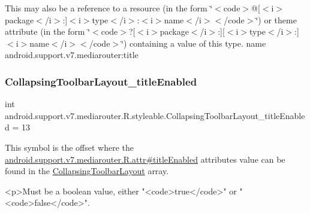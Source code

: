 This may also be a reference to a resource (in the form \char`\"{}$<$code$>$@\mbox{[}$<$i$>$package$<$/i$>$\+:\mbox{]}$<$i$>$type$<$/i$>$\+:$<$i$>$name$<$/i$>$$<$/code$>$\char`\"{}) or theme attribute (in the form \char`\"{}$<$code$>$?\mbox{[}$<$i$>$package$<$/i$>$\+:\mbox{]}\mbox{[}$<$i$>$type$<$/i$>$\+:\mbox{]}$<$i$>$name$<$/i$>$$<$/code$>$\char`\"{}) containing a value of this type.  name android.\+support.\+v7.\+mediarouter\+:title \mbox{\label{classandroid_1_1support_1_1v7_1_1mediarouter_1_1R_1_1styleable_afd96eea83afe0af62d5c951105c47546}} 
\subsubsection{\texorpdfstring{Collapsing\+Toolbar\+Layout\+\_\+title\+Enabled}{CollapsingToolbarLayout\_titleEnabled}}
{\footnotesize\ttfamily int android.\+support.\+v7.\+mediarouter.\+R.\+styleable.\+Collapsing\+Toolbar\+Layout\+\_\+title\+Enabled = 13\hspace{0.3cm}{\ttfamily [static]}}

This symbol is the offset where the \hyperlink{classandroid_1_1support_1_1v7_1_1mediarouter_1_1R_1_1attr_a3d454b580504f78acb2c462a84d3796a}{android.\+support.\+v7.\+mediarouter.\+R.\+attr\#title\+Enabled} attribute\textquotesingle{}s value can be found in the \hyperlink{classandroid_1_1support_1_1v7_1_1mediarouter_1_1R_1_1styleable_aae2cb4975e9b9a19d129888f497cc386}{Collapsing\+Toolbar\+Layout} array.

\begin{DoxyVerb}      <p>Must be a boolean value, either "<code>true</code>" or "<code>false</code>".
\end{DoxyVerb}
 

